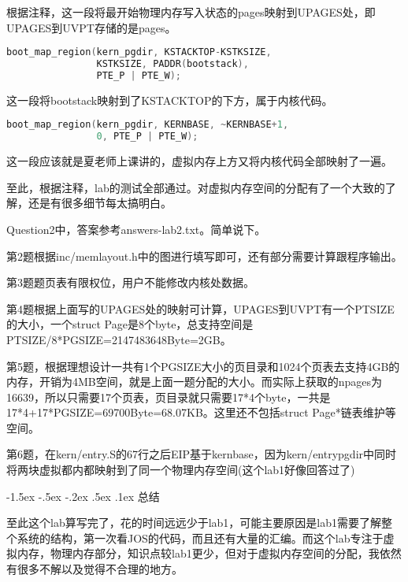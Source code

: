 \documentclass[11pt,a4paper]{article}
\makeatletter
\newcommand{\sanhao}{\fontsize{15.75pt}{\baselineskip}\selectfont}
\renewcommand\section{\@startsection{section}{1}{\z@}%
{-1.5ex \@plus -.5ex \@minus -.2ex}%
{.5ex \@plus .1ex}%
{\normalfont\sanhao\fontspec{黑体}}}
\makeatother
\begin{document}
根据注释，这一段将最开始物理内存写入状态的pages映射到UPAGES处，即UPAGES到UVPT存储的是pages。



\setmainfont{Consolas}
\begin{lstlisting}[language={C},firstnumber=200,title=kern/pmap.c]
boot_map_region(kern_pgdir, KSTACKTOP-KSTKSIZE,
				KSTKSIZE, PADDR(bootstack),
				PTE_P | PTE_W);
\end{lstlisting}
\setmainfont[BoldFont=黑体]{宋体}

这一段将bootstack映射到了KSTACKTOP的下方，属于内核代码。

\setmainfont{Consolas}
\begin{lstlisting}[language={C},firstnumber=210,title=kern/pmap.c]
boot_map_region(kern_pgdir, KERNBASE, ~KERNBASE+1,
				0, PTE_P | PTE_W);
\end{lstlisting}
\setmainfont[BoldFont=黑体]{宋体}

这一段应该就是夏老师上课讲的，虚拟内存上方又将内核代码全部映射了一遍。

至此，根据注释，lab的测试全部通过。对虚拟内存空间的分配有了一个大致的了解，还是有很多细节每太搞明白。

Question2中，答案参考answers-lab2.txt。简单说下。

第2题根据inc/memlayout.h中的图进行填写即可，还有部分需要计算跟程序输出。

第3题题页表有限权位，用户不能修改内核处数据。

第4题根据上面写的UPAGES处的映射可计算，UPAGES到UVPT有一个PTSIZE的大小，一个struct Page是8个byte，总支持空间是PTSIZE/8*PGSIZE=2147483648Byte=2GB。

第5题，根据理想设计一共有1个PGSIZE大小的页目录和1024个页表去支持4GB的内存，开销为4MB空间，就是上面一题分配的大小。而实际上获取的npages为16639，所以只需要17个页表，页目录就只需要17*4个byte，一共是17*4+17*PGSIZE=69700Byte=68.07KB。这里还不包括struct Page*链表维护等空间。

第6题，在kern/entry.S的67行之后EIP基于kernbase，因为kern/entrypgdir中同时将两块虚拟都内都映射到了同一个物理内存空间(这个lab1好像回答过了)

\section{总结}

至此这个lab算写完了，花的时间远远少于lab1，可能主要原因是lab1需要了解整个系统的结构，第一次看JOS的代码，而且还有大量的汇编。而这个lab专注于虚拟内存，物理内存部分，知识点较lab1更少，但对于虚拟内存空间的分配，我依然有很多不解以及觉得不合理的地方。
\end{document}

